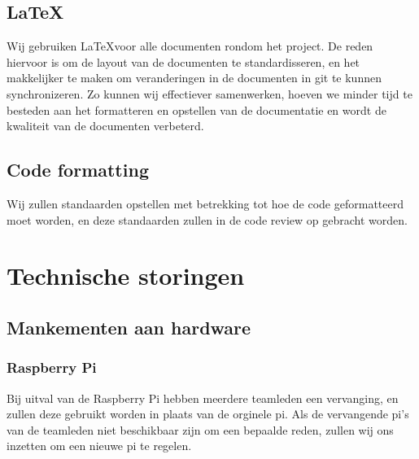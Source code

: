 	\subsection{\LaTeX}
		Wij gebruiken \LaTeX voor alle documenten rondom het project.
		De reden hiervoor is om de layout van de documenten te standardisseren, en het makkelijker te maken om veranderingen in de documenten in git te kunnen synchronizeren.
		Zo kunnen wij effectiever samenwerken, hoeven we minder tijd te besteden aan het formatteren en opstellen van de documentatie en wordt de kwaliteit van de documenten verbeterd.
	\subsection{Code formatting}
		 Wij zullen standaarden opstellen met betrekking tot hoe de code geformatteerd moet worden, en deze standaarden zullen in de code review op gebracht worden.

\section{Technische storingen}
	\subsection{Mankementen aan hardware}
		\subsubsection{Raspberry Pi}
			Bij uitval van de Raspberry Pi hebben meerdere teamleden een vervanging, en zullen deze gebruikt worden in plaats van de orginele pi.
			Als de vervangende pi's van de teamleden niet beschikbaar zijn om een bepaalde reden, zullen wij ons inzetten om een nieuwe pi te regelen.

